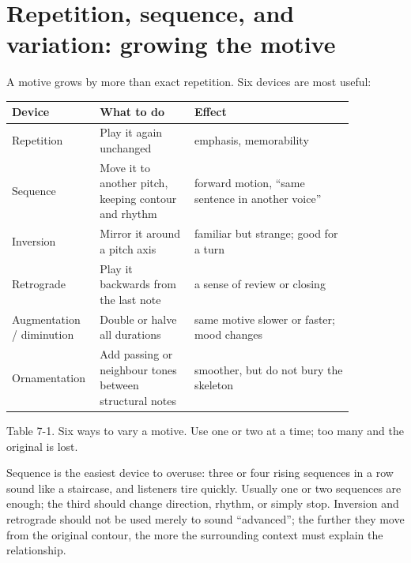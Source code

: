\section{Repetition, sequence, and variation: growing the motive}

A motive grows by more than exact repetition. Six devices are most useful:

\begin{center}
\small
\begin{tabular}{p{0.16\linewidth}p{0.26\linewidth}p{0.44\linewidth}}
\toprule
Device & What to do & Effect \\
\midrule
Repetition & Play it again unchanged & emphasis, memorability \\
Sequence & Move it to another pitch, keeping contour and rhythm & forward motion, ``same sentence in another voice'' \\
Inversion & Mirror it around a pitch axis & familiar but strange; good for a turn \\
Retrograde & Play it backwards from the last note & a sense of review or closing \\
Augmentation / diminution & Double or halve all durations & same motive slower or faster; mood changes \\
Ornamentation & Add passing or neighbour tones between structural notes & smoother, but do not bury the skeleton \\
\bottomrule
\end{tabular}

Table 7-1. Six ways to vary a motive. Use one or two at a time; too many and the original is lost.
\end{center}

Sequence is the easiest device to overuse: three or four rising sequences in a row sound like a staircase, and listeners tire quickly. Usually one or two sequences are enough; the third should change direction, rhythm, or simply stop. Inversion and retrograde should not be used merely to sound ``advanced''; the further they move from the original contour, the more the surrounding context must explain the relationship.

